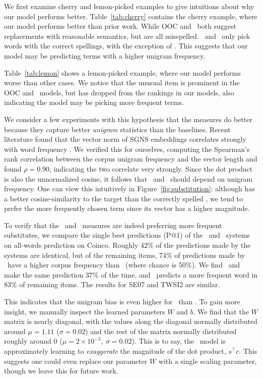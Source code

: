 We first examine cherry and lemon-picked examples to give intuitions about why
our model performs better. Table~\ref{tab:cherry} contains the cherry example,
where our model performs better than prior work. While OOC and \balAddCos~both
suggest replacements with reasonable semantics, but are all misspelled.
\ourmeas~and \ourmeasparam~only pick words with the correct spellings, with the
exception of . This suggests that our model may be predicting terms
with a higher unigram frequency.

Table~\ref{tab:lemon} shows a lemon-picked example, where our model performs
worse than other cases.  We notice that the unusual  item is
prominent in the OOC and \balAddCos~models, but has dropped from the rankings
in our models, also indicating the model may be picking more frequent terms.

We consider a few experiments with this hypothesis that the measures do better
because they capture better {\em unigram} statistics than the baselines. Recent
literature found that the vector norm of SGNS embeddings correlates strongly
with word frequency \cite{wilson:2015:arxiv}. We verified this for ourselves,
computing the Spearman's rank correlation between the corpus unigram frequency
and the vector length and found $\rho = 0.90$, indicating the two correlate
very strongly. Since the dot product is also the unnormalized cosine, it
follows that \ourmeas~and \ourmeasparam~should depend on unigram frequency.
One can view this intuitively in Figure~\ref{fig:substitution}: although
 has a better cosine-similarity to the target than the correctly
spelled , we tend to prefer the more frequently chosen term
since its vector has a higher magnitude.

To verify that the \ourmeas~and \ourmeasparam~measures are indeed preferring
more frequent substitutes, we compare the single best predictions (P@1) of the
\balAddCos~and \ourmeas~systems on all-words prediction on Coinco. Roughly 42\%
of the predictions made by the systems are identical, but of the remaining
items, 74\% of predictions made by \ourmeas~have a higher corpus frequency than
\balAddCos~(where chance is 50\%). We find \balAddCos~and \ourmeasparam~ make
the same prediction 37\% of the time, and \ourmeasparam~predicts a more
frequent word in 83\% of remaining items. The results for SE07 and TWSI2 are
similar.

This indicates that the unigram bias is even higher for \ourmeasparam~than
\ourmeas. To gain more insight, we manually inspect the learned parameters $W$
and $b$. We find that the $W$ matrix is nearly diagonal, with the values along
the diagonal normally distributed around $\mu=1.11$ ($\sigma=0.02$) and the
rest of the matrix normally distributed roughly around 0
($\mu=2\times10^{-5},~\sigma=0.02$). This is to say, the \ourmeasparam~model is
approximately learning to {\em exaggerate} the magnitude of the dot product,
$s^\top c$. This suggests one could even replace our parameter $W$ with a
single scaling parameter, though we leave this for future work.

